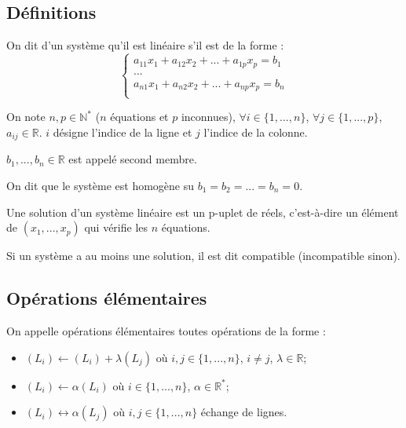 \documentclass[10pt]{article}
\begin{document}
\subsection{Définitions}
\begin{defi}
On dit d'un système qu'il est linéaire s'il est de la forme :
$$
\left\{
\begin{array}{l}
a_{11}x_1 + a_{12}x_2 + ... + a_{1p}x_p = b_1 \\
... \\ 
a_{n1}x_1 + a_{n2}x_2 + ... + a_{np}x_p = b_n \\
\end{array}
\right.
$$

On note $n,p\in \mathbb{N}^*$ ($n$ équations et $p$ inconnues), $\forall i\in \{1,...,n\}$, $\forall j\in \{1,...,p\}$, $a_{ij} \in \mathbb{R}$. $i$ désigne l'indice de la ligne et $j$ l'indice de la colonne. 

$b_1, ..., b_n \in \mathbb{R}$ est appelé second membre. 
\end{defi}

\begin{defi}
On dit que le système est homogène su $b_1=b_2=...=b_n=0$.
\end{defi}

\begin{defi}
Une solution d'un système linéaire est un p-uplet de réels, c'est-à-dire un élément de $(x_1,...,x_p)$ qui vérifie les $n$ équations. 
\end{defi}


\begin{defi}
Si un système a au moins une solution, il est dit compatible (incompatible sinon).
\end{defi}


\subsection{Opérations élémentaires}
On appelle opérations élémentaires toutes opérations de la forme :
\begin{itemize}
\item $(L_i)\leftarrow (L_i)+\lambda (L_j)$ où $i,j\in \{1,...,n\}$, $i\neq j$, $\lambda \in \mathbb{R}$;
\item $(L_i)\leftarrow \alpha (L_i)$ où $i\in \{1,...,n\}$, $\alpha \in \mathbb{R}^*$;
\item $(L_i)\leftrightarrow \alpha (L_j)$ où $i,j\in \{1,...,n\}$ échange de lignes. 
\end{itemize}
\end{document}
